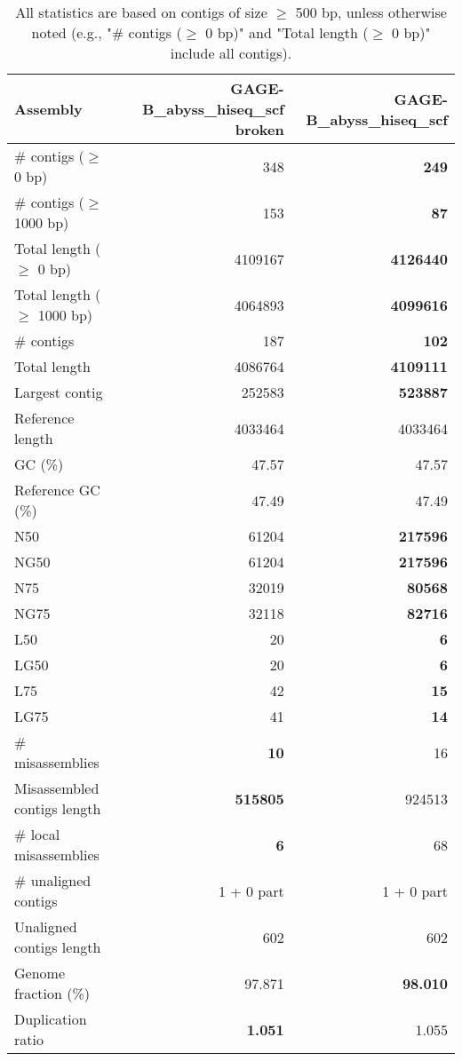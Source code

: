 \documentclass[12pt,a4paper]{article}
\begin{document}
\begin{table}[ht]
\begin{center}
\caption{All statistics are based on contigs of size $\geq$ 500 bp, unless otherwise noted (e.g., "\# contigs ($\geq$ 0 bp)" and "Total length ($\geq$ 0 bp)" include all contigs).}
\begin{tabular}{|l*{2}{|r}|}
\hline
Assembly & GAGE-B\_abyss\_hiseq\_scf broken & GAGE-B\_abyss\_hiseq\_scf \\ \hline
\# contigs ($\geq$ 0 bp) & 348 & {\bf 249} \\ \hline
\# contigs ($\geq$ 1000 bp) & 153 & {\bf 87} \\ \hline
Total length ($\geq$ 0 bp) & 4109167 & {\bf 4126440} \\ \hline
Total length ($\geq$ 1000 bp) & 4064893 & {\bf 4099616} \\ \hline
\# contigs & 187 & {\bf 102} \\ \hline
Total length & 4086764 & {\bf 4109111} \\ \hline
Largest contig & 252583 & {\bf 523887} \\ \hline
Reference length & 4033464 & 4033464 \\ \hline
GC (\%) & 47.57 & 47.57 \\ \hline
Reference GC (\%) & 47.49 & 47.49 \\ \hline
N50 & 61204 & {\bf 217596} \\ \hline
NG50 & 61204 & {\bf 217596} \\ \hline
N75 & 32019 & {\bf 80568} \\ \hline
NG75 & 32118 & {\bf 82716} \\ \hline
L50 & 20 & {\bf 6} \\ \hline
LG50 & 20 & {\bf 6} \\ \hline
L75 & 42 & {\bf 15} \\ \hline
LG75 & 41 & {\bf 14} \\ \hline
\# misassemblies & {\bf 10} & 16 \\ \hline
Misassembled contigs length & {\bf 515805} & 924513 \\ \hline
\# local misassemblies & {\bf 6} & 68 \\ \hline
\# unaligned contigs & 1 + 0 part & 1 + 0 part \\ \hline
Unaligned contigs length & 602 & 602 \\ \hline
Genome fraction (\%) & 97.871 & {\bf 98.010} \\ \hline
Duplication ratio & {\bf 1.051} & 1.055 \\ \hline

\end{tabular}
\end{center}
\end{table}
\end{document}
